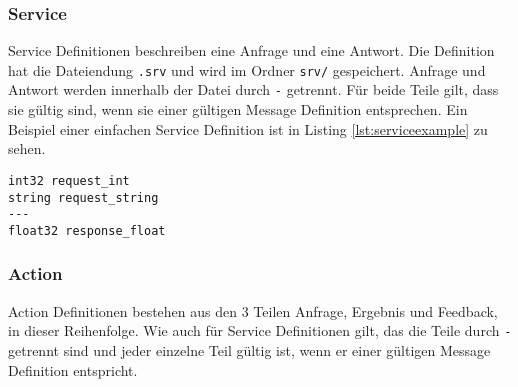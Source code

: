 \subsubsection{Service}
Service Definitionen beschreiben eine Anfrage und eine Antwort. Die Definition hat die Dateiendung \verb|.srv| und wird  im Ordner \verb|srv/| gespeichert. Anfrage und Antwort werden innerhalb der Datei durch \verb|-| getrennt. Für beide Teile gilt, dass sie gültig sind, wenn sie einer gültigen Message Definition entsprechen. Ein Beispiel einer einfachen Service Definition ist in Listing \ref{lst:serviceexample} zu sehen.\\
\begin{minipage}{\linewidth}%
\begin{lstlisting}[caption={Beispiel einer Service Definition}, label={lst:serviceexample}]
int32 request_int
string request_string
---
float32 response_float
\end{lstlisting}
\end{minipage}
\subsubsection{Action}
Action Definitionen bestehen aus den 3 Teilen Anfrage, Ergebnis und Feedback, in dieser Reihenfolge. Wie auch für Service Definitionen gilt, das die Teile durch \verb|-| getrennt sind und jeder einzelne Teil gültig ist, wenn er einer gültigen Message Definition entspricht. 
